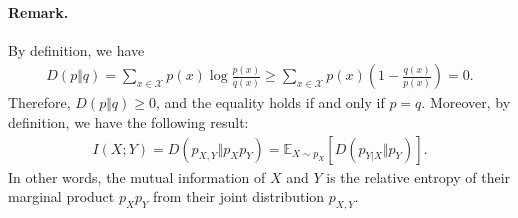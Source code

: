 \documentclass{article}
\numberwithin{equation}{section}
\newcommand{\E}{\mathbb{E}}
\renewcommand{\cal}{\mathcal}
\theoremstyle{plain}
\theoremstyle{definition}
\begin{document}
\paragraph{Remark.} By definition, we have
\begin{align*}
D(p\Vert q)=\sum_{x\in\mathcal{X}}p(x)\log\frac{p(x)}{q(x)}\geq\sum_{x\in\cal{X}}p(x)\left(1-\frac{q(x)}{p(x)}\right)=0.
\end{align*}
Therefore, $D(p\Vert q)\geq 0$, and the equality holds if and only if $p=q$. Moreover, by definition, we have the following result:
\begin{align*}
	I(X;Y)=D(p_{X,Y}\Vert p_Xp_Y)=\E_{X\sim p_X}\left[D(p_{Y|X}\Vert p_Y)\right].
\end{align*}
In other words, the mutual information of $X$ and $Y$ is the relative entropy of their marginal product $p_Xp_Y$ from their joint distribution $p_{X,Y}$.
\end{document}
